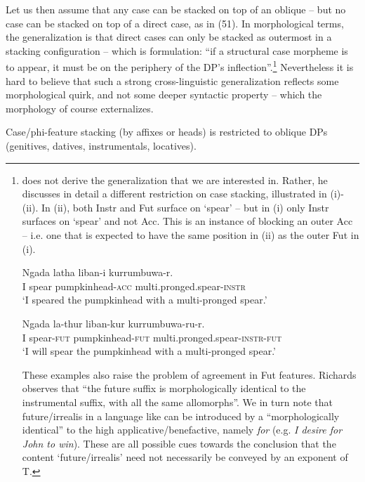 \documentclass[output=paper]{langsci/langscibook}
\begin{document}
Let us then assume that any case can be stacked on top of an oblique – but no case can be stacked on top of a direct case, as in (51). In morphological terms, the generalization is that direct cases can only be stacked as outermost in a stacking configuration – which is  formulation: “if a structural case morpheme is to appear, it must be on the periphery of the DP’s inflection”.\footnote{\citet{Richards2013} does not derive the generalization that we are interested in. Rather, he discusses in detail a different restriction on case stacking, illustrated in (i)-(ii). In (ii), both Instr and Fut surface on ‘spear’ – but in (i) only Instr surfaces on ‘spear’ and not Acc. This is an instance of blocking an outer Acc – i.e. one that is expected to have the same position in (ii) as the outer Fut in (i).

\ea \gll    Ngada latha   liban-i       kurrumbuwa-r.\\
            I   spear   pumpkinhead-\textsc{acc}   multi.pronged.spear-\textsc{instr}\\
    \glt    ‘I speared the pumpkinhead with a multi-pronged spear.’\\
\z

\ea \gll    Ngada     la-thur     liban-kur     kurrumbuwa-ru-r.\\
            I     spear-\textsc{fut}   pumpkinhead-\textsc{fut}   multi.pronged.spear-\textsc{instr-fut}\\
    \glt    ‘I will spear the pumpkinhead with a multi-pronged spear.’\\
\z

These examples also raise the problem of agreement in Fut features. Richards observes that “the future suffix is morphologically identical to the instrumental suffix, with all the same allomorphs”. We in turn note that future\slash irrealis in a language like  can be introduced by a  “morphologically identical” to the high applicative\slash benefactive, namely \textit{for} (e.g. \textit{I desire for John to win}). These are all possible cues towards the conclusion that the content ‘future\slash irrealis’ need not necessarily be conveyed by an exponent of T.}  Nevertheless it is hard to believe that such a strong cross-linguistic generalization reflects some morphological quirk, and not some deeper syntactic property – which the morphology of course externalizes. 

\ea%
    \label{ex:manzini:51}
    Case/phi-feature stacking (by affixes or  heads) is restricted to oblique DPs (genitives, datives, instrumentals, locatives).  
    \z         
\end{document}
